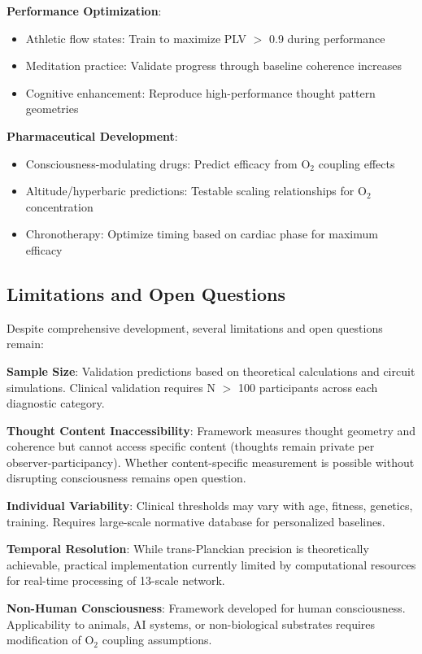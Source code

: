 \documentclass[11pt,onecolumn]{article}
\begin{document}
\textbf{Performance Optimization}:
\begin{itemize}
\item Athletic flow states: Train to maximize PLV $>$ 0.9 during performance
\item Meditation practice: Validate progress through baseline coherence increases
\item Cognitive enhancement: Reproduce high-performance thought pattern geometries
\end{itemize}

\textbf{Pharmaceutical Development}:
\begin{itemize}
\item Consciousness-modulating drugs: Predict efficacy from O$_2$ coupling effects
\item Altitude/hyperbaric predictions: Testable scaling relationships for O$_2$ concentration
\item Chronotherapy: Optimize timing based on cardiac phase for maximum efficacy
\end{itemize}

\subsection{Limitations and Open Questions}

Despite comprehensive development, several limitations and open questions remain:

\textbf{Sample Size}: Validation predictions based on theoretical calculations and circuit simulations. Clinical validation requires N $>$ 100 participants across each diagnostic category.

\textbf{Thought Content Inaccessibility}: Framework measures thought geometry and coherence but cannot access specific content (thoughts remain private per observer-participancy). Whether content-specific measurement is possible without disrupting consciousness remains open question.

\textbf{Individual Variability}: Clinical thresholds may vary with age, fitness, genetics, training. Requires large-scale normative database for personalized baselines.

\textbf{Temporal Resolution}: While trans-Planckian precision is theoretically achievable, practical implementation currently limited by computational resources for real-time processing of 13-scale network.

\textbf{Non-Human Consciousness}: Framework developed for human consciousness. Applicability to animals, AI systems, or non-biological substrates requires modification of O$_2$ coupling assumptions.
\end{document}
